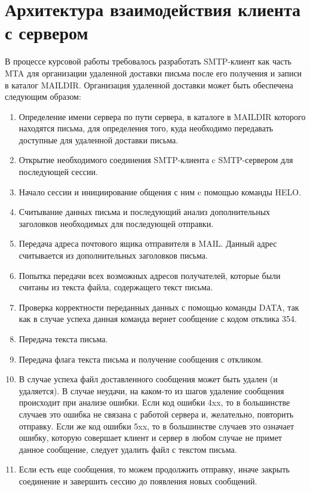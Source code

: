 \documentclass[a4paper,12pt]{report}
\begin{document}
	\section{Архитектура взаимодействия клиента с сервером}

        В процессе курсовой работы требовалось разработать SMTP-клиент как часть MTA для организации удаленной доставки письма после его получения и записи в каталог MAILDIR. Организация удаленной доставки может быть обеспечена следующим образом:
	\begin{enumerate}
		\item Определение имени сервера по пути сервера, в каталоге в MAILDIR которого находятся письма, для определения того, куда необходимо передавать доступные для удаленной доставки письма.
		\item Открытие необходимого соединения SMTP-клиента c SMTP-сервером для последующей сессии.
		\item Начало сессии и инициирование общения с ним c помощью команды HELO.
		\item Считывание данных письма и последующий анализ дополнительных заголовков необходимых для последующей отправки.
		\item Передача адреса почтового ящика отправителя в MAIL. Данный адрес считывается из дополнительных заголовков письма.
		\item Попытка передачи всех возможных адресов получателей, которые были считаны из текста файла, содержащего текст письма.
		\item Проверка корректности переданных данных с помощью команды DATA, так как в случае успеха данная команда вернет сообщение с кодом отклика 354.
		\item Передача текста письма.
		\item Передача флага текста письма и получение сообщения с откликом.
		\item В случае успеха файл доставленного сообщения может быть удален (и удаляется). В случае неудачи, на каком-то из шагов удаление сообщения происходит при анализе ошибки. Если код ошибки 4xx, то в большинстве случаев это ошибка не связана с работой сервера и, желательно, повторить отправку. Если же код ошибки 5xx, то в большинстве случаев это означает ошибку, которую совершает клиент и сервер в любом случае не примет данное сообщение, следует удалить файл с текстом письма.
		\item Если есть еще сообщения, то можем продолжить отправку, иначе закрыть соединение и завершить сессию до появления новых сообщений.
	\end{enumerate}
	
\end{document}
